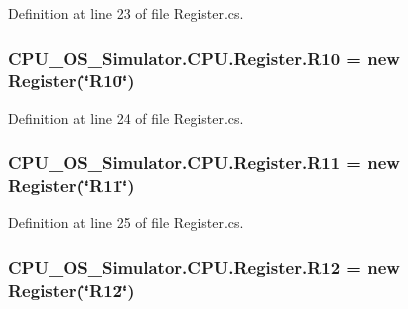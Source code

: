 Definition at line 23 of file Register.\+cs.

\hypertarget{class_c_p_u___o_s___simulator_1_1_c_p_u_1_1_register_aafde355f621c35a2994b26ac1ad8c61b}{}
\subsubsection[{R10}]{ C\+P\+U\+\_\+\+O\+S\+\_\+\+Simulator.\+C\+P\+U.\+Register.\+R10 = new {\bf Register}(\char`\"{}R10\char`\"{})\hspace{0.3cm}{\ttfamily [static]}}\label{class_c_p_u___o_s___simulator_1_1_c_p_u_1_1_register_aafde355f621c35a2994b26ac1ad8c61b}


Definition at line 24 of file Register.\+cs.

\hypertarget{class_c_p_u___o_s___simulator_1_1_c_p_u_1_1_register_a4f593c7d99a4e42966dea3749c07b79d}{}
\subsubsection[{R11}]{ C\+P\+U\+\_\+\+O\+S\+\_\+\+Simulator.\+C\+P\+U.\+Register.\+R11 = new {\bf Register}(\char`\"{}R11\char`\"{})\hspace{0.3cm}{\ttfamily [static]}}\label{class_c_p_u___o_s___simulator_1_1_c_p_u_1_1_register_a4f593c7d99a4e42966dea3749c07b79d}


Definition at line 25 of file Register.\+cs.

\hypertarget{class_c_p_u___o_s___simulator_1_1_c_p_u_1_1_register_abb2b38dad72e0b3e97fcf7e09a0bf1f9}{}
\subsubsection[{R12}]{ C\+P\+U\+\_\+\+O\+S\+\_\+\+Simulator.\+C\+P\+U.\+Register.\+R12 = new {\bf Register}(\char`\"{}R12\char`\"{})\hspace{0.3cm}{\ttfamily [static]}}\label{class_c_p_u___o_s___simulator_1_1_c_p_u_1_1_register_abb2b38dad72e0b3e97fcf7e09a0bf1f9}



